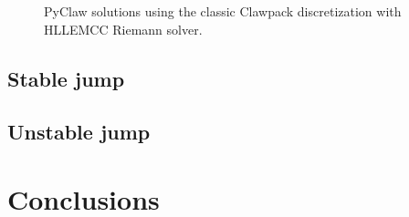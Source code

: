 \documentclass{article}
\begin{document}
\begin{figure}
  \begin{centering}
  \end{centering}
  \caption{
    PyClaw solutions using the classic Clawpack discretization
    with HLLEMCC Riemann solver.\label{fig:hllemcc}}
\end{figure}

\subsection{Stable jump}

\subsection{Unstable jump}

\section{Conclusions}




\end{document}
